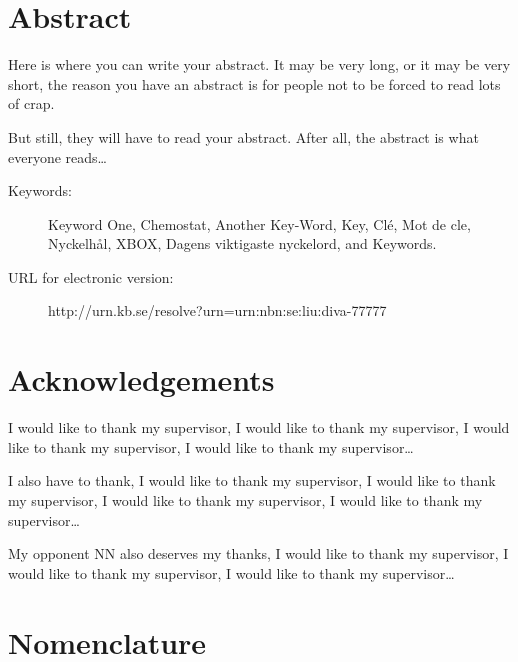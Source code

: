 \documentclass[a4paper, 10pt, twoside, openright]{book}
\newcommand{\putabstract}[0]{%
Here is where you can write your abstract. It may be very long, or it
may be very short, the reason you have an abstract is for people not
to be forced to read lots of crap.

But still, they will have to read your abstract. After all, the
abstract is what everyone reads\ldots}
\newcommand{\putkeywords}[0]{%
Keyword One, Chemostat, Another Key-Word, Key, Clé, Mot de cle,
Nyckelhål, XBOX, Dagens viktigaste nyckelord, and Keywords.}
\begin{document}
\pagestyle{fancy}

\chapter*{Abstract}
\putabstract

\begin{description}
\item[Keywords:]{%
\putkeywords
}
\item[URL for electronic version: ]{\hfill%
\begin{center}
http://urn.kb.se/resolve?urn=urn:nbn:se:liu:diva-77777
\end{center}
}
\end{description}



\chapter*{Acknowledgements}

I would like to thank my supervisor, I would like to thank my
supervisor, I would like to thank my supervisor, I would like to thank my supervisor\ldots

I also have to thank, I would like to thank my supervisor, I would
like to thank my supervisor, I would like to thank my supervisor, I
would like to thank my supervisor\ldots

My opponent NN also deserves my thanks, I would like to thank my
supervisor, I would like to thank my supervisor, I would like to thank my supervisor\ldots





\chapter*{Nomenclature}
\end{document}
